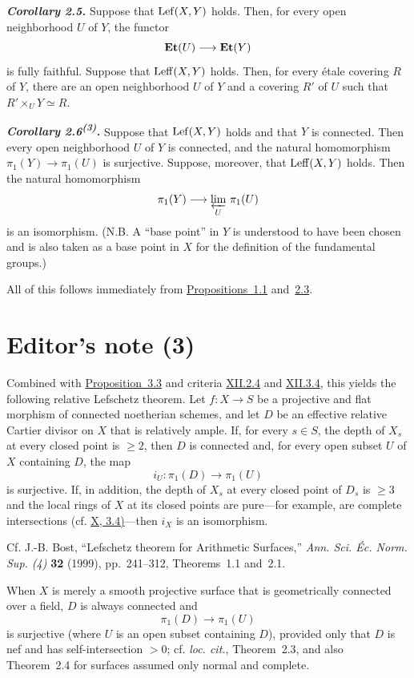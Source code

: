 \medskip
{}\noindent\textbf{\textit{Corollary 2.5.}}
Suppose that $\operatorname{Lef}(X,Y)$ holds. Then, for every open neighborhood $U$ of
$Y$, the functor
\[
  \mathbf{Et}(U)\longrightarrow\mathbf{Et}(Y)
\]
is fully faithful. Suppose that $\operatorname{Leff}(X,Y)$ holds. Then, for every
\'{e}tale covering $R$ of $Y$, there are an open neighborhood $U$ of $Y$
and a covering $R'$ of $U$ such that
$R'\times_U Y\simeq R$.

\medskip
{}\noindent\textbf{\textit{Corollary 2.6\textsuperscript{(3)}.}}
Suppose that $\operatorname{Lef}(X,Y)$ holds and that $Y$ is connected. Then every open
neighborhood $U$ of $Y$ is connected, and the natural homomorphism
$\pi_1(Y)\longrightarrow\pi_1(U)$ is surjective. Suppose, moreover, that
$\operatorname{Leff}(X,Y)$ holds. Then the natural homomorphism
\[
  \pi_1(Y)\longrightarrow\varprojlim_{U}\,\pi_1(U)
\]
is an isomorphism. (N.B. A ``base point'' in $Y$ is understood to have been
chosen and is also taken as a base point in $X$ for the definition of the
fundamental groups.)

\medskip
\noindent All of this follows immediately from \hyperref[X.1.1]{Propositions~1.1} and~\hyperref[X.2.3]{2.3}.

\section*{Editor's note (3)}
Combined with \hyperref[X.3.3]{Proposition~3.3} and criteria \hyperref[XII.2.4]{XII.2.4} and \hyperref[XII.3.4]{XII.3.4}, this yields the
following relative Lefschetz theorem. Let $f\colon X\to S$ be a projective and
flat morphism of connected noetherian schemes, and let $D$ be an effective
relative Cartier divisor on $X$ that is relatively ample. If, for every
$s\in S$, the depth of $X_s$ at every closed point is $\geq 2$, then $D$ is
connected and, for every open subset $U$ of $X$ containing $D$, the map
\[
  i_U\colon \pi_1(D)\longrightarrow\pi_1(U)
\]
is surjective. If, in addition, the depth of $X_s$ at every closed point of
$D_s$ is $\geq 3$ and the local rings of $X$ at its closed points are
pure---for example, are complete intersections (cf. \hyperref[X.3.4]{X, 3.4)}---then $i_X$ is an
isomorphism.

Cf. J.-B. Bost, ``Lefschetz theorem for Arithmetic Surfaces,''
\emph{Ann. Sci. \'Ec. Norm. Sup. (4)} \textbf{32} (1999), pp.~241--312,
Theorems~1.1 and~2.1.

When $X$ is merely a smooth projective surface that is geometrically connected
over a field, $D$ is always connected and
\[
  \pi_1(D)\longrightarrow\pi_1(U)
\]
is surjective (where $U$ is an open subset containing $D$), provided only that
$D$ is nef and has self-intersection $>0$; cf. \emph{loc. cit.}, Theorem~2.3,
and also Theorem~2.4 for surfaces assumed only normal and complete.

